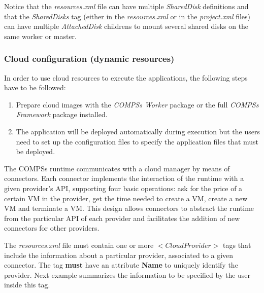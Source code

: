 Notice that the \textit{resources.xml} file can have multiple \textit{SharedDisk} definitions and that the \textit{SharedDisks}
tag (either in the \textit{resources.xml} or in the \textit{project.xml} files) can have multiple \textit{AttachedDisk} childrens
to mount several shared disks on the same worker or master. 

\subsubsection{Cloud configuration (dynamic resources)}
In order to use cloud resources to execute the applications, the following steps have to be followed:
\begin{enumerate}
 \item Prepare cloud images with the \textit{COMPSs Worker} package or the full \textit{COMPSs Framework} package installed.
 \item The application will be deployed automatically during execution but the users need to set up the configuration files to
 specify the application files that must be deployed. 
\end{enumerate}

The COMPSs runtime communicates with a cloud manager by means of connectors. Each connector implements 
the interaction of the runtime with a given provider's API, supporting four basic 
operations: ask for the price of a certain VM in the provider, get the time needed to create a VM, 
create a new VM and terminate a VM. This design allows connectors to abstract the runtime from the particular API
of each provider and facilitates the addition of new connectors for other providers.

The \textit{resources.xml} file must contain one or more \textbf{$<CloudProvider>$} tags
that include the information about a particular provider, associated to a given connector. The tag \textbf{must} have an
attribute \textbf{Name} to uniquely identify the provider. Next example summarizes the information to be specified by the 
user inside this tag.

